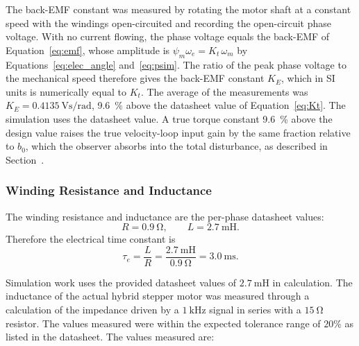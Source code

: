 The back-EMF constant was measured by rotating the motor shaft at a constant speed with the windings open-circuited and recording the open-circuit phase voltage. With no current flowing, the phase voltage equals the back-EMF of Equation~\eqref{eq:emf}, whose amplitude is $\psi_m \omega_e = K_t\, \omega_m$ by Equations~\eqref{eq:elec_angle} and~\eqref{eq:psim}. The ratio of the peak phase voltage to the mechanical speed therefore gives the back-EMF constant $K_E$, which in SI units is numerically equal to $K_t$. The average of the measurements was $K_E = \SI{0.4135}{\volt\second\per\radian}$, \SI{9.6}{\percent} above the datasheet value of Equation~\eqref{eq:Kt}. The simulation uses the datasheet value. A true torque constant \SI{9.6}{\percent} above the design value raises the true velocity-loop input gain by the same fraction relative to $b_0$, which the observer absorbs into the total disturbance, as described in Section~.


\subsubsection{Winding Resistance and Inductance}

The winding resistance and inductance are the per-phase datasheet values:
\begin{equation}
	R = \SI{0.9}{\ohm}, \qquad L = \SI{2.7}{\milli\henry}.
	\label{eq:RL}
\end{equation}
Therefore the electrical time constant is 
\begin{equation}
	\tau_e = \frac{L}{R} = \frac{\SI{2.7}{\milli\henry}}{\SI{0.9}{\ohm}}
	= \SI{3.0}{\milli\second}.
	\label{eq:taue}
\end{equation}

Simulation work uses the provided datasheet values of $\SI{2.7}{\milli\henry}$ in calculation. The inductance of the actual hybrid stepper motor was measured through a calculation of the impedance driven by a $\SI{1}{\kilo\hertz}$ signal in series with a $\SI{15}{\ohm}$ resistor. The values measured were within the expected tolerance range of ${20\%}$ as listed in the datasheet. The values measured are: 
 

